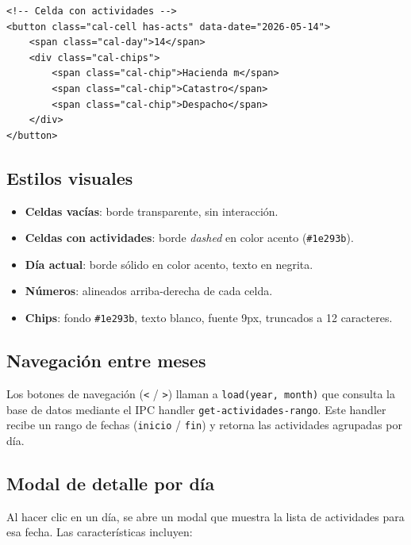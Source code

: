 \documentclass[12pt,a4paper]{article}
\begin{document}
\begin{lstlisting}[caption={Estructura de celda del calendario}, label=lst:cal-cell]
<!-- Celda con actividades -->
<button class="cal-cell has-acts" data-date="2026-05-14">
    <span class="cal-day">14</span>
    <div class="cal-chips">
        <span class="cal-chip">Hacienda m</span>
        <span class="cal-chip">Catastro</span>
        <span class="cal-chip">Despacho</span>
    </div>
</button>
\end{lstlisting}

\subsection{Estilos visuales}

\begin{itemize}[leftmargin=*]
    \item \textbf{Celdas vacías}: borde transparente, sin interacción.
    \item \textbf{Celdas con actividades}: borde \textit{dashed} en color acento (\texttt{\#1e293b}).
    \item \textbf{Día actual}: borde sólido en color acento, texto en negrita.
    \item \textbf{Números}: alineados arriba-derecha de cada celda.
    \item \textbf{Chips}: fondo \texttt{\#1e293b}, texto blanco, fuente 9px, truncados a 12 caracteres.
\end{itemize}

\subsection{Navegación entre meses}

Los botones de navegación (\texttt{\textless} / \texttt{\textgreater}) llaman a \texttt{load(year, month)} que consulta la base de datos mediante el IPC handler \texttt{get-actividades-rango}. Este handler recibe un rango de fechas (\texttt{inicio} / \texttt{fin}) y retorna las actividades agrupadas por día.

\subsection{Modal de detalle por día}

Al hacer clic en un día, se abre un modal que muestra la lista de actividades para esa fecha. Las características incluyen:
\end{document}
